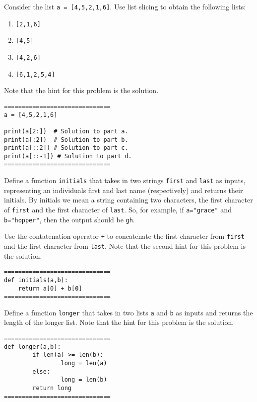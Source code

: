 \documentclass{ximera}
\begin{document}
\begin{question}
	Consider the list \verb|a = [4,5,2,1,6]|. Use list slicing to obtain the following lists:
	\begin{enumerate}
	\item \verb|[2,1,6]|
	\item \verb|[4,5]|
	\item \verb|[4,2,6]|
	\item \verb|[6,1,2,5,4]|
	\end{enumerate}
	Note that the hint for this problem is the solution.
	\begin{hint}
\begin{verbatim}
==============================
a = [4,5,2,1,6]

print(a[2:])  # Solution to part a.
print(a[:2])  # Solution to part b.
print(a[::2]) # Solution to part c.
print(a[::-1]) # Solution to part d.
==============================
\end{verbatim}
	\end{hint}
\end{question}

\begin{question}
	Define a function \verb|initials| that takes in two strings \verb|first| and \verb|last| as inputs, representing an individuals first and last name (respectively) and returns their initials. By initials we mean a string containing two characters, the first character of \verb|first| and the first character of \verb|last|. So, for example, if \verb|a="grace"| and \verb|b="hopper"|, then the output should be \verb|gh|.
	\begin{hint}
	Use the contatenation operator \verb|+| to concatenate the first character from \verb|first| and the first character from \verb|last|. Note that the second hint for this problem is the solution.
	\end{hint}
	\begin{hint}
\begin{verbatim}
==============================
def initials(a,b):
	return a[0] + b[0]
==============================
\end{verbatim}
	\end{hint}
\end{question}

\begin{question}
Define a function \verb|longer| that takes in two lists \verb|a| and \verb|b| as inputs and returns the length of the longer list. Note that the hint for this problem is the solution.
	\begin{hint}
\begin{verbatim}
==============================
def longer(a,b):
        if len(a) >= len(b):
                long = len(a)
        else:
                long = len(b)
        return long
==============================
\end{verbatim}
	\end{hint}
\end{question}
\end{document}
